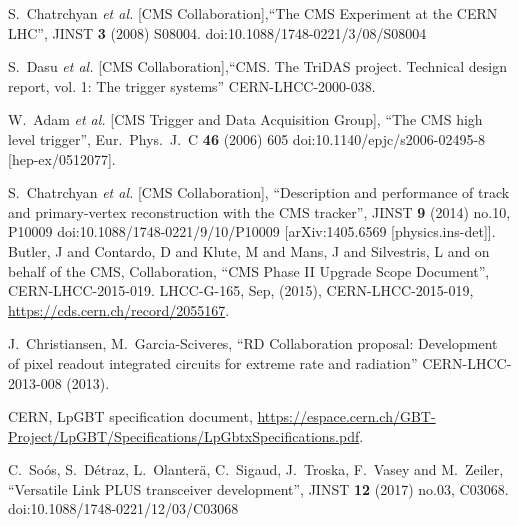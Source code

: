 \begin{thebibliography}{1}
%
 S.~Chatrchyan {\it et al.} [CMS Collaboration],``The CMS Experiment at the CERN LHC'', JINST {\bf 3} (2008) S08004. doi:10.1088/1748-0221/3/08/S08004

  S.~Dasu {\it et al.} [CMS Collaboration],``CMS. The TriDAS project. Technical design report, vol. 1: The trigger systems'' CERN-LHCC-2000-038.


  W.~Adam {\it et al.} [CMS Trigger and Data Acquisition Group], ``The CMS high level trigger'',  Eur.\ Phys.\ J.\ C {\bf 46} (2006) 605 doi:10.1140/epjc/s2006-02495-8 [hep-ex/0512077].


  S.~Chatrchyan {\it et al.} [CMS Collaboration], ``Description and performance of track and primary-vertex reconstruction with the CMS tracker'', JINST {\bf 9} (2014) no.10,  P10009 doi:10.1088/1748-0221/9/10/P10009  [arXiv:1405.6569 [physics.ins-det]].
 Butler, J and Contardo, D and Klute, M and Mans, J and
                       Silvestris, L and on behalf of the CMS, Collaboration,
      ``CMS Phase II Upgrade Scope Document'',
      CERN-LHCC-2015-019. LHCC-G-165,
      Sep, (2015),
      CERN-LHCC-2015-019, \url{https://cds.cern.ch/record/2055167}.

 J.~Christiansen, M.~Garcia-Sciveres, ``RD Collaboration proposal: Development of pixel readout integrated circuits for extreme rate and radiation''
CERN-LHCC-2013-008 (2013).

 CERN, LpGBT specification document,
\url{https://espace.cern.ch/GBT-Project/LpGBT/Specifications/LpGbtxSpecifications.pdf}.

%
 C.~Soós, S.~Détraz, L.~Olanterä, C.~Sigaud, J.~Troska, F.~Vasey and M.~Zeiler, ``Versatile Link PLUS transceiver development'', JINST {\bf 12} (2017) no.03,  C03068. doi:10.1088/1748-0221/12/03/C03068


\end{thebibliography}

